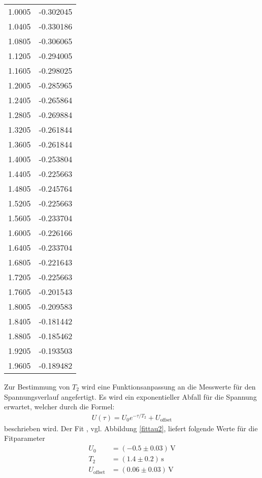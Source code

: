 \begin{table}
\begin{tabular}{c|c}
    1.0005&-0.302045\\
    1.0405&-0.330186\\
    1.0805&-0.306065\\
    1.1205&-0.294005\\
    1.1605&-0.298025\\
    1.2005&-0.285965\\
    1.2405&-0.265864\\
    1.2805&-0.269884\\
    1.3205&-0.261844\\
    1.3605&-0.261844\\
    1.4005&-0.253804\\
    1.4405&-0.225663\\
    1.4805&-0.245764\\
    1.5205&-0.225663\\
    1.5605&-0.233704\\
    1.6005&-0.226166\\
    1.6405&-0.233704\\
    1.6805&-0.221643\\
    1.7205&-0.225663\\
    1.7605&-0.201543\\
    1.8005&-0.209583\\
    1.8405&-0.181442\\
    1.8805&-0.185462\\
    1.9205&-0.193503\\
    1.9605&-0.189482\\
    \bottomrule
  \end{tabular}
\end{table}

Zur Bestimmung von $T_2$ wird eine Funktionsanpassung an die Messwerte für
den Spannungsverlauf angefertigt. Es wird ein exponentieller Abfall
für die Spannung erwartet, welcher durch die Formel:
\begin{align}
    \label{fitt2}
    U(\tau)=U_0 e^{-\tau / T_2}+U_\text{offset}
\end{align}
beschrieben wird.
Der Fit , vgl. Abbildung \ref{fittau2},  liefert folgende Werte für die Fitparameter
\begin{align*}
    U_0&=(-0.5 \pm 0.03) \, \text{V}\\
    T_2&=(1.4 \pm 0.2) \, \text{s}\\
    U_\text{offset}&=(0.06 \pm 0.03) \, \text{V}
\end{align*}



